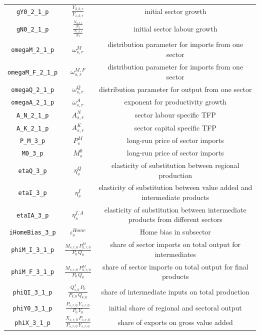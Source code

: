 \begin{center}
\begin{longtable}{ccc}
\texttt{gY0\_2\_1\_p} & ${\frac{Y_{2,k,r}}{Y_{1,k,r}}}$ & initial sector growth\\
\texttt{gN0\_2\_1\_p} & ${\frac{\frac{N_{2,k,r}}{N_{2}}}{\frac{N_{1,k,r}}{N_{1}}}}$ & initial sector labour growth\\
\texttt{omegaM\_2\_1\_p} & ${\omega^{M}_{s,r}}$ & distribution parameter for imports from one sector\\
\texttt{omegaM\_F\_2\_1\_p} & ${\omega^{M,F}_{s,r}}$ & distribution parameter for imports from one sector\\
\texttt{omegaQ\_2\_1\_p} & ${\omega^{Q}_{s,r}}$ & distribution parameter for output from one sector\\
\texttt{omegaA\_2\_1\_p} & ${\omega^{A}_{s,r}}$ & exponent for productivity growth\\
\texttt{A\_N\_2\_1\_p} & ${A^{N}_{s,r}}$ & sector labour specific TFP\\
\texttt{A\_K\_2\_1\_p} & ${A^{K}_{s,r}}$ & sector capital specific TFP\\
\texttt{P\_M\_3\_p} & ${P^{M}_{s}}$ & long-run price of sector imports\\
\texttt{M0\_3\_p} & ${M^{0}_{s}}$ & long-run price of sector imports\\
\texttt{etaQ\_3\_p} & ${\eta^{Q}_{s}}$ & elasticity of substitution between regional production\\
\texttt{etaI\_3\_p} & ${\eta^{I}_{s}}$ & elasticity of substitution between value added and intermediate products\\
\texttt{etaIA\_3\_p} & ${\eta^{I,A}_{s}}$ & elasticity of substitution between intermediate products from different sectors\\
\texttt{iHomeBias\_3\_p} & ${\iota^{Home}_{s}}$ & Home bias in subsector\\
\texttt{phiM\_I\_3\_1\_p} & $\frac{M_{s,r,0} \, P^{M}_{k,r,0}}{P_{0} \, Q_{0}}$ & share of sector imports on total output for intermediates\\
\texttt{phiM\_F\_3\_1\_p} & $\frac{M_{s,r,0} \, P^{M}_{k,r,0}}{P_{0} \, Q_{0}}$ & share of sector imports on total output for final products\\
\texttt{phiQI\_3\_1\_p} & $\frac{Q^{I}_{s,0} \, P_{0}}{P_{k,0} \, Q_{k,0}}$ & share of intermediate inputs on total production\\
\texttt{phiY0\_3\_1\_p} & $\frac{P_{s,r,0} \, Y_{s,r,0}}{P_{0} \, Y_{0}}$ & initial share of regional and sectoral output\\
\texttt{phiX\_3\_1\_p} & $\frac{X_{s,r,0} \, P_{s,r,0}}{P_{s,r,0} \, Y_{s,r,0}}$ & share of exports on gross value added\\

\end{longtable}
\end{center}
